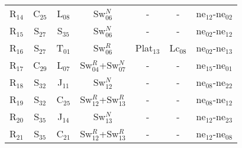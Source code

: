 \begin{table}[!h]
{{\begin{tabular}{ c c c c c c c }
                    R$_{14}$  & C$_{25}$ & L$_{08}$ & Sw$_{06}^{N}$ & - & - & ne$_{12}$-ne$_{02}$\\
                    R$_{15}$  & S$_{27}$ & S$_{35}$ & Sw$_{06}^{N}$ & - & - & ne$_{02}$-ne$_{12}$\\
                    R$_{16}$  & S$_{27}$ & T$_{01}$ & Sw$_{06}^{R}$ & Plat$_{13}$ & Lc$_{08}$ & ne$_{02}$-ne$_{13}$\\
                    R$_{17}$  & C$_{29}$ & L$_{07}$ & Sw$_{04}^{R}$+Sw$_{07}^{N}$ & - & - & ne$_{15}$-ne$_{01}$\\
                    R$_{18}$  & S$_{32}$ & J$_{11}$ & Sw$_{12}^{N}$ & - & - & ne$_{08}$-ne$_{22}$\\
                    R$_{19}$  & S$_{32}$ & C$_{25}$ & Sw$_{12}^{R}$+Sw$_{13}^{R}$ & - & - & ne$_{08}$-ne$_{12}$\\
                    R$_{20}$  & S$_{35}$ & J$_{14}$ & Sw$_{13}^{N}$ & - & - & ne$_{12}$-ne$_{23}$\\
                    R$_{21}$  & S$_{35}$ & C$_{21}$ & Sw$_{12}^{R}$+Sw$_{13}^{R}$ & - & - & ne$_{12}$-ne$_{08}$\\
                \hline
            \end{tabular}
        }
     }
    \end{table}